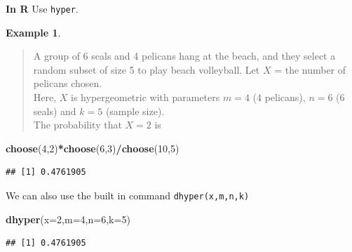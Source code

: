 \documentclass[
]{book}
\newenvironment{Shaded}{\begin{snugshade}}{\end{snugshade}}
\newcommand{\AttributeTok}[1]{\textcolor[rgb]{0.13,0.29,0.53}{#1}}
\newcommand{\DecValTok}[1]{\textcolor[rgb]{0.00,0.00,0.81}{#1}}
\newcommand{\FunctionTok}[1]{\textcolor[rgb]{0.13,0.29,0.53}{\textbf{#1}}}
\newcommand{\NormalTok}[1]{#1}
\newcommand{\SpecialCharTok}[1]{\textcolor[rgb]{0.81,0.36,0.00}{\textbf{#1}}}
\theoremstyle{definition}
\theoremstyle{definition}
\newtheorem{example}{Example}[chapter]
\theoremstyle{definition}
\theoremstyle{definition}
\theoremstyle{remark}
\begin{document}
\textbf{In R} Use \texttt{hyper}.

\begin{example}
\protect\hypertarget{exm:seals-hyper-R}{}\label{exm:seals-hyper-R}\leavevmode

\begin{quote}
A group of 6 seals and 4 pelicans hang at the beach, and they select a random subset of size 5 to play beach volleyball. Let \(X\) = the number of pelicans chosen.\\
Here, \(X\) is hypergeometric with parameters \(m = 4\) (4 pelicans), \(n = 6\) (6 seals) and \(k = 5\) (sample size).\\
The probability that \(X = 2\) is
\end{quote}

\begin{Shaded}
\begin{Highlighting}[]
\FunctionTok{choose}\NormalTok{(}\DecValTok{4}\NormalTok{,}\DecValTok{2}\NormalTok{)}\SpecialCharTok{*}\FunctionTok{choose}\NormalTok{(}\DecValTok{6}\NormalTok{,}\DecValTok{3}\NormalTok{)}\SpecialCharTok{/}\FunctionTok{choose}\NormalTok{(}\DecValTok{10}\NormalTok{,}\DecValTok{5}\NormalTok{)}
\end{Highlighting}
\end{Shaded}

\begin{verbatim}
## [1] 0.4761905
\end{verbatim}

We can also use the built in command \texttt{dhyper(x,m,n,k)}

\begin{Shaded}
\begin{Highlighting}[]
\FunctionTok{dhyper}\NormalTok{(}\AttributeTok{x=}\DecValTok{2}\NormalTok{,}\AttributeTok{m=}\DecValTok{4}\NormalTok{,}\AttributeTok{n=}\DecValTok{6}\NormalTok{,}\AttributeTok{k=}\DecValTok{5}\NormalTok{)}
\end{Highlighting}
\end{Shaded}

\begin{verbatim}
## [1] 0.4761905
\end{verbatim}

\end{example}
\end{document}
